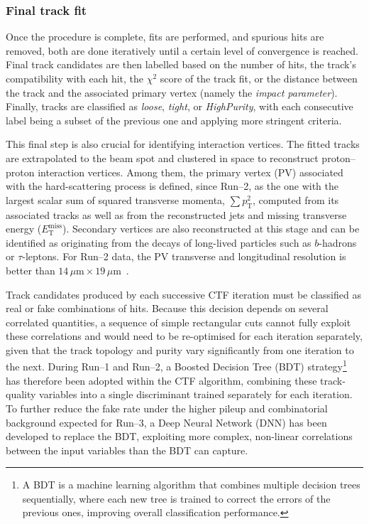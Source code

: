 \subsubsection{Final track fit}
\label{sec:final_track_fit}

Once the procedure is complete, fits are performed, and spurious hits are removed, both are done iteratively until a certain level of convergence is reached. Final track candidates are then labelled based on the number of hits, the track's compatibility with each hit, the $\chi^2$ score of the track fit, or the distance between the track and the associated primary vertex (namely the \textit{impact parameter}). Finally, tracks are classified as \textit{loose}, \textit{tight}, or \textit{HighPurity}, with each consecutive label being a subset of the previous one and applying more stringent criteria.

This final step is also crucial for identifying interaction vertices. The fitted tracks are extrapolated to the beam spot and clustered in space to reconstruct proton–proton interaction vertices. Among them, the primary vertex (PV) associated with the hard-scattering process is defined, since Run--2, as the one with the largest scalar sum of squared transverse momenta, $\sum p_{\textrm{T}}^2$, computed from its associated tracks as well as from the reconstructed jets and missing transverse energy ($E_{\textrm{T}}^{\textrm{miss}}$). Secondary vertices are also reconstructed at this stage and can be identified as originating from the decays of long-lived particles such as $b$-hadrons or $\tau$-leptons. For Run--2 data, the PV transverse and longitudinal resolution is better than $14\,\mu\textrm{m} \times 19\,\mu\textrm{m}$~\cite{Run3_pv_resolution}.

\vspace{0.5 cm}

Track candidates produced by each successive CTF iteration must be classified as real or fake combinations of hits. Because this decision depends on several correlated quantities, a sequence of simple rectangular cuts cannot fully exploit these correlations and would need to be re-optimised for each iteration separately, given that the track topology and purity vary significantly from one iteration to the next. During Run--1 and Run--2, a Boosted Decision Tree (BDT) strategy\footnote{A BDT is a machine learning algorithm that combines multiple decision trees sequentially, where each new tree is trained to correct the errors of the previous ones, improving overall classification performance.} has therefore been adopted within the CTF algorithm, combining these track-quality variables into a single discriminant trained separately for each iteration. To further reduce the fake rate under the higher pileup and combinatorial background expected for Run--3, a Deep Neural Network (DNN) has been developed to replace the BDT, exploiting more complex, non-linear correlations between the input variables than the BDT can capture.

